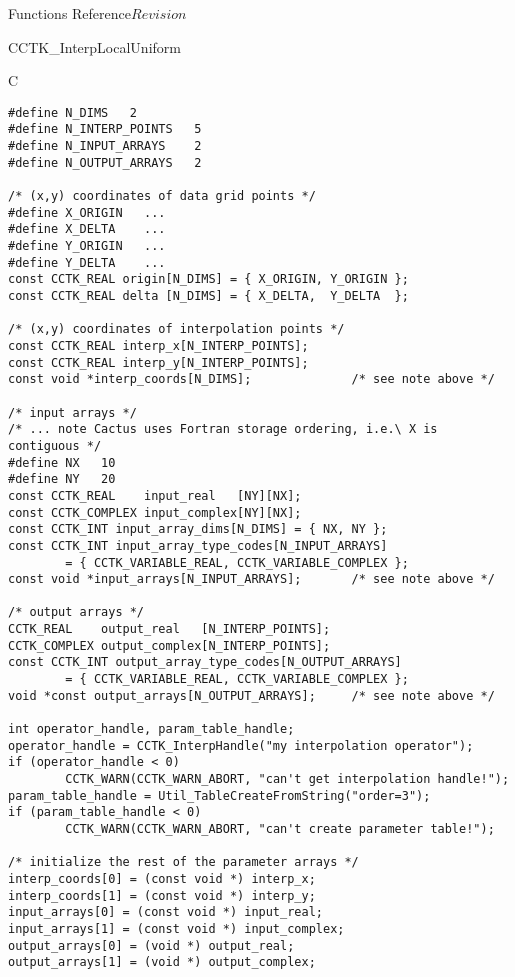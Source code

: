 \begin{cactuspart}{ Functions Reference}{}{$Revision$}
\begin{FunctionDescription}{CCTK\_InterpLocalUniform}
\begin{ExampleSection}
\begin{Example}{C}
\begin{verbatim}
#define N_DIMS   2
#define N_INTERP_POINTS   5
#define N_INPUT_ARRAYS    2
#define N_OUTPUT_ARRAYS   2

/* (x,y) coordinates of data grid points */
#define X_ORIGIN   ...
#define X_DELTA    ...
#define Y_ORIGIN   ...
#define Y_DELTA    ...
const CCTK_REAL origin[N_DIMS] = { X_ORIGIN, Y_ORIGIN };
const CCTK_REAL delta [N_DIMS] = { X_DELTA,  Y_DELTA  };

/* (x,y) coordinates of interpolation points */
const CCTK_REAL interp_x[N_INTERP_POINTS];
const CCTK_REAL interp_y[N_INTERP_POINTS];
const void *interp_coords[N_DIMS];              /* see note above */

/* input arrays */
/* ... note Cactus uses Fortran storage ordering, i.e.\ X is contiguous */
#define NX   10
#define NY   20
const CCTK_REAL    input_real   [NY][NX];
const CCTK_COMPLEX input_complex[NY][NX];
const CCTK_INT input_array_dims[N_DIMS] = { NX, NY };
const CCTK_INT input_array_type_codes[N_INPUT_ARRAYS]
        = { CCTK_VARIABLE_REAL, CCTK_VARIABLE_COMPLEX };
const void *input_arrays[N_INPUT_ARRAYS];       /* see note above */

/* output arrays */
CCTK_REAL    output_real   [N_INTERP_POINTS];
CCTK_COMPLEX output_complex[N_INTERP_POINTS];
const CCTK_INT output_array_type_codes[N_OUTPUT_ARRAYS]
        = { CCTK_VARIABLE_REAL, CCTK_VARIABLE_COMPLEX };
void *const output_arrays[N_OUTPUT_ARRAYS];     /* see note above */

int operator_handle, param_table_handle;
operator_handle = CCTK_InterpHandle("my interpolation operator");
if (operator_handle < 0)
        CCTK_WARN(CCTK_WARN_ABORT, "can't get interpolation handle!");
param_table_handle = Util_TableCreateFromString("order=3");
if (param_table_handle < 0)
        CCTK_WARN(CCTK_WARN_ABORT, "can't create parameter table!");

/* initialize the rest of the parameter arrays */
interp_coords[0] = (const void *) interp_x;
interp_coords[1] = (const void *) interp_y;
input_arrays[0] = (const void *) input_real;
input_arrays[1] = (const void *) input_complex;
output_arrays[0] = (void *) output_real;
output_arrays[1] = (void *) output_complex;


\end{verbatim}
\end{Example}
\end{ExampleSection}
\end{FunctionDescription}
\end{cactuspart}
